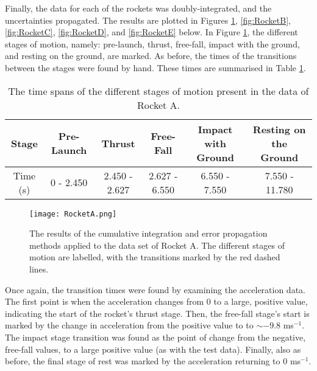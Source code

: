 \documentclass{article}
\begin{document}
        Finally, the data for each of the rockets was doubly-integrated, and the uncertainties propagated. The results are plotted in Figures \ref{fig:RocketA}, \ref{fig:RocketB}, \ref{fig:RocketC}, \ref{fig:RocketD}, and \ref{fig:RocketE} below. In Figure \ref{fig:RocketA}, the different stages of motion, namely: pre-launch, thrust, free-fall, impact with the ground, and resting on the ground, are marked. As before, the times of the transitions between the stages were found by hand. These times are summarised in Table \ref{tab:rocketA_transitions}.

        \begin{table}[H]
            \centering
            \begin{tabular}{|c|c|c|c|c|c|}
            \hline
                Stage & Pre-Launch & Thrust & Free-Fall & Impact with Ground & Resting on the Ground \\
                \hline
                 Time (s) & 0 - 2.450 & 2.450 - 2.627 & 2.627 - 6.550 & 6.550 - 7.550 & 7.550 - 11.780 \\
                 \hline
            \end{tabular}
            \caption{The time spans of the different stages of motion present in the data of Rocket A.}
            \label{tab:rocketA_transitions}
        \end{table}

        \begin{figure}[H]
            \centering
            \texttt{[image: RocketA.png]}
            \caption{The results of the cumulative integration and error propagation methods applied to the data set of Rocket A. The different stages of motion are labelled, with the transitions marked by the red dashed lines.}
            \label{fig:RocketA}
        \end{figure}

        Once again, the transition times were found by examining the acceleration data. The first point is when the acceleration changes from 0 to a large, positive value, indicating the start of the rocket's thrust stage. Then, the free-fall stage's start is marked by the change in acceleration from the positive value to to $\sim -9.8$ ms$^{-1}$. The impact stage transition was found as the point of change from the negative, free-fall values, to a large positive value (as with the test data). Finally, also as before, the final stage of rest was marked by the acceleration returning to 0 ms$^{-1}$.
\end{document}
